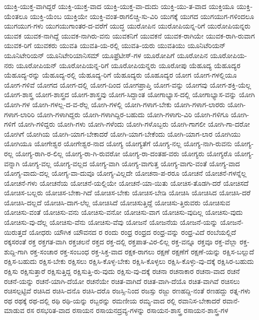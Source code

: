 {ಯುಕ್ತಿ-ಯುಕ್ತ-ವಾಗಿದ್ದರೆ
ಯುಕ್ತಿ-ಯುಕ್ತ-ವಾದ
ಯುಕ್ತಿ-ಯುಕ್ತ-ವಾ-ದುದು
ಯುಕ್ತಿ-ಯು-ತ-ವಾದ
ಯುಕ್ತಿಯೂ
ಯುಕ್ತಿ-ಯೆಂತಲೂ
ಯುಕ್ತಿ-ಯೆಂಬ
ಯುಕ್ತಿಯೇ
ಯುಕ್ತಿ-ವಂತ-ರಾಗಲಿಚ್ಚಿ-ಸು-ವಿರಿ
ಯುಗಕ್ಕೆ
ಯುಗದ
ಯುಗಯುಗ-ಗಳಿಂದಲೂ
ಯುಗಯುಗ-ಗಳು
ಯುಗಯುಗಾಂತರ-ದ-ವರೆಗೆ
ಯುದ್ಧ
ಯುರೋಪಿನ
ಯುರೋಪಿಯನ್ನ-ರಿಗೆ
ಯುರೋಪಿಯನ್ನರು
ಯುವಕ
ಯುವಕ-ನಾಗಿದ್ದೆ
ಯುವಕ-ನಾಗಿರು-ವನು
ಯುವಕನಿಗೆ
ಯುವಕನೆ
ಯುವಕ-ರಾಗಿಯೇ
ಯುವಕ-ರಾಗಿ-ರುವಾಗ
ಯುವಕ-ರಿಗೆ
ಯುವಕರು
ಯುವತಿ
ಯುವತಿ-ಯ-ರಲ್ಲಿ
ಯುವತಿ-ಯರು
ಯುವತಿಯು
ಯೂನಿಟೆರಿಯನ್
ಯೂನಿಟೇರಿಯನ್
ಯೂನಿಟೇರಿಯಾನಿಸಮ್
ಯೂಫ್ರೆಟೀಸ್-ಗಳ
ಯೂರೋಪಿಗೆ
ಯೂರೋಪಿನ
ಯೂರೋಪಿಯ-ನರು
ಯೂರೋಪಿಯನ್
ಯೂರೋಪಿಯನ್ನ-ರಿಗೆ
ಯೂರೋಪಿಯನ್ನರು
ಯೂರೋಪು
ಯೆಹೂದ್ಯ
ಯೆಹೂದ್ಯರ
ಯೆಹೂದ್ಯ-ರನ್ನು
ಯೆಹೂದ್ಯ-ರಲ್ಲಿ
ಯೆಹೂದ್ಯ-ರಿಗೆ
ಯೆಹೂದ್ಯರು
ಯೊಹೂದ್ಯರ
ಯೋಗ
ಯೋಗ-ಗಳಲ್ಲಿಯೂ
ಯೋಗ-ಗಳಿವೆ
ಯೋಗದ
ಯೋಗ-ದಲ್ಲಿ
ಯೋಗ-ದಿಂದ
ಯೋಗಪ್ರಾಪ್ತಿ
ಯೋಗ-ವನ್ನು
ಯೋಗವು
ಯೋಗ-ಶಕ್ತಿ-ಯೆಲ್ಲ
ಯೋಗ-ಶಾಸ್ತ್ರ
ಯೋಗ-ಶಾಸ್ತ್ರದ
ಯೋಗ-ಶಾಸ್ತ್ರವು
ಯೋಗ-ಸಿದ್ದಾಂತ
ಯೋಗಾಭ್ಯಾಸ-ದಲ್ಲಿ
ಯೋಗಾಭ್ಯಾಸ-ವನ್ನು
ಯೋಗಿ
ಯೋಗಿ-ಗಳ
ಯೋಗಿ-ಗಳಲ್ಲ-ದ-ವ-ರೆಲ್ಲ
ಯೋಗಿ-ಗಳಲ್ಲಿ
ಯೋಗಿ-ಗಳಾಗ-ಬೇಕು
ಯೋಗಿ-ಗಳಾಗ-ಲಾರರು
ಯೋಗಿ-ಗಳಾಗ-ಲಾರಿರಿ
ಯೋಗಿ-ಗಳಾಗಿದ್ದರು
ಯೋಗಿ-ಗಳಾಗಿದ್ದಿರ-ಬಹುದು
ಯೋಗಿ-ಗಳಾಗು-ವಿರಿ
ಯೋಗಿ-ಗಳಿಗೂ
ಯೋಗಿ-ಗಳಿಗೆ
ಯೋಗಿ-ಗಳಿದ್ದರು
ಯೋಗಿ-ಗಳು
ಯೋಗಿ-ಗಳೆಂದು
ಯೋಗಿ-ಗಳೊಬ್ಬರು
ಯೋಗಿ-ಗಾಗಲೀ
ಯೋಗಿ-ಗಾ-ದರೋ
ಯೋಗಿಗೆ
ಯೋಗಿಯ
ಯೋಗಿ-ಯಾಗ-ಬೇಕಾದರೆ
ಯೋಗಿ-ಯಾಗ-ಬೇಕೆಂದು
ಯೋಗಿ-ಯಾಗ-ಲಾರ
ಯೋಗಿಯು
ಯೋಗಿಯೂ
ಯೋಗೇಶ್ವರ
ಯೋಗೇಶ್ವರ-ನಾದ
ಯೋಗ್ಯ
ಯೋಗ್ಯತೆಗೆ
ಯೋಗ್ಯ-ನಲ್ಲ
ಯೋಗ್ಯ-ನಾಗಿ-ರುವನು
ಯೋಗ್ಯ-ರಲ್ಲ
ಯೋಗ್ಯ-ರಾಗಿ-ರ-ಲಿಲ್ಲ
ಯೋಗ್ಯ-ರಾ-ಗಿ-ರುವರೋ
ಯೋಗ್ಯ-ರಾ-ದಂತಹ-ವರು
ಯೋಗ್ಯರು
ಯೋಗ್ಯರೊ
ಯೋಗ್ಯ-ವನ್ನಾಗಿ
ಯೋಗ್ಯ-ವಲ್ಲ
ಯೋಗ್ಯ-ವಲ್ಲದ
ಯೋಗ್ಯ-ವಾಗಿ
ಯೋಗ್ಯ-ವಾಗುತ್ತ
ಯೋಗ್ಯ-ವಾಗು-ವಂತೆ
ಯೋಗ್ಯ-ವಾದ
ಯೋಗ್ಯ-ವಾದು-ದಲ್ಲ
ಯೋಗ್ಯ-ವಾ-ದುವೂ
ಯೋಗ್ಯ-ವಿಲ್ಲದೇ
ಯೋಚನಾ-ಪ-ರರೂ
ಯೋಚನೆ
ಯೋಚನೆ-ಗಳನ್ನೆಲ್ಲ
ಯೋಚನೆ-ಗಳು
ಯೋಚನೆಯ
ಯೋಚನೆ-ಯಲ್ಲಿಯೇ
ಯೋಚನೆ-ಯಾ-ಯಿತು
ಯೋಚಿಸ-ತೊಡಗಿ-ದರೆ
ಯೋಚಿಸದೆ
ಯೋಚಿಸ-ಬಲ್ಲರು
ಯೋಚಿಸ-ಬೇಕಾ-ಗಿದೆ
ಯೋಚಿಸ-ಬೇಕು
ಯೋಚಿಸ-ಬೇಡಿ
ಯೋಚಿಸಿ
ಯೋಚಿಸಿದ
ಯೋಚಿಸಿ-ದರೆ
ಯೋಚಿಸಿ-ದಲ್ಲದೆ
ಯೋಚಿಸಿ-ದಾಗ-ಲೆಲ್ಲ
ಯೋಚಿಸಿದೆ
ಯೋಚಿಸುತ್ತಿದ್ದೆ
ಯೋಚಿಸು-ತ್ತಿರುವರು
ಯೋಚಿಸುವ
ಯೋಚಿಸು-ವಂತೆ
ಯೋಚಿಸು-ವನು
ಯೋಚಿಸು-ವನೋ
ಯೋಚಿಸು-ವಾಗ
ಯೋಚಿಸು-ವುದಿಲ್ಲ
ಯೋಚಿಸು-ವುದು
ಯೋಚಿಸು-ವು-ದೆಲ್ಲ
ಯೋಚಿಸು-ವೆನು
ಯೋಚಿಸು-ವೆವು
ಯೋಜನೆ
ಯೋಜನೆಯ
ಯೋಜನೆ-ಯನ್ನು
ಯೋಜನೆ-ಯಿರುತ್ತದೆ
ಯೋಧರು
ಯೌಗಿಕ
ಯೌವನದ
ರ
ರಂದು
ರಂಧ್ರ
ರಂಧ್ರದ
ರಂಧ್ರ-ವನ್ನು
ರಂಧ್ರ-ವಿದೆ
ರಂಬೆಯಲ್ಲಿದೆ
ರಕ್ಕಸರಂತೆ
ರಕ್ತ
ರಕ್ತಗತ-ವಾಗಿ
ರಕ್ತಚಲನೆ
ರಕ್ತದ
ರಕ್ತ-ದಲ್ಲಿ
ರಕ್ತಪಾತ-ವಿರ-ಲಿಲ್ಲ
ರಕ್ತ-ವನ್ನೂ
ರಕ್ತವೂ
ರಕ್ತ-ವೆಲ್ಲಾ
ರಕ್ತ-ಶುದ್ದಿ-ಗಾಗಿ
ರಕ್ತ-ಸಂಚಾರ
ರಕ್ತ-ಸಂಬಂಧ
ರಕ್ತ-ಸಿಕ್ತ-ವಾದ
ರಕ್ಷಕ-ರಾಗಲು
ರಕ್ಷಣೆ
ರಕ್ಷಣೆಗೆ
ರಕ್ಷಣೆ-ಯನ್ನು
ರಕ್ಷಿಸ-ಬಲ್ಲುದೆ
ರಕ್ಷಿಸ-ಬಹುದು
ರಕ್ಷಿಸ-ಬೇಕು
ರಕ್ಷಿಸಲು
ರಕ್ಷಿಸಿ-ಕೊಳ್ಳ-ಬೇಕು
ರಕ್ಷಿಸಿ-ಕೊಳ್ಳಲು
ರಕ್ಷಿಸಿ-ಕೊಳ್ಳು-ವು-ದಕ್ಕೆ
ರಕ್ಷಿಸಿರ-ಬಹುದು
ರಕ್ಷಿಸು
ರಕ್ಷಿಸುತ್ತಾರೆ
ರಕ್ಷಿಸುತ್ತಿದ್ದ
ರಕ್ಷಿಸುತ್ತಿ-ರು-ವುದು
ರಕ್ಷಿಸು-ವು-ದಕ್ಕೆ
ರಚನಾ
ರಚನಾಕಾರ
ರಚನಾ-ವಾದ
ರಚನೆ
ರಚನೆ-ಯನ್ನು
ರಚನೆ-ಯಾಗಿ-ದೆಯೋ
ರಚನೆಯೇ
ರಚಿತ-ವಾಗಿದೆ
ರಚಿತ-ವಾಗಿ-ದೆಯೊ
ರಚಿತ-ವಾಗಿವೆ
ರಚಿಸಲು
ರಚಿಸಲ್ಪಟ್ಟಿವೆ
ರಚಿಸಿದ
ರಚಿಸಿ-ದನೊ
ರಚಿಸಿ-ದರೊ
ರಜಸ್ಸಿ-ನಿಂದ
ರಜಸ್ಸು
ರಜ್ಜು
ರಣಹದ್ದಿ-ನಂತೆ
ರಣಹದ್ದು
ರತ್ನ-ಗಳು
ರಥ
ರಥಕ್ಕೆ
ರಥ-ದಲ್ಲಿ
ರಥಿ
ರಥಿ-ಯನ್ನು
ರಬ್ಬರನ್ನು
ರಮಣೀಯ
ರಮ್ಯ-ವಾದ
ರಲ್ಲಿ
ರವಾನಿಸ-ಬೇಕಾದರೆ
ರವಾನೆ-ಮಾಡುವ
ರಸ
ರಸಭರಿತ-ವಾದ
ರಸಾಯನ
ರಸಾಯನದ್ರವ್ಯ-ಗಳನ್ನು
ರಸಾಯನ-ಶಾಸ್ತ್ರ
ರಸಾಯನ-ಶಾಸ್ತ್ರ-ಗಳ
}
